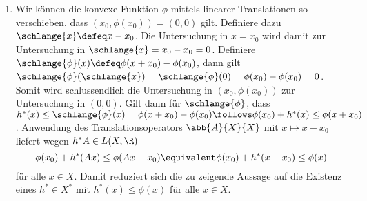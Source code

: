 \begin{exercisePage}
	\begin{enumerate}[label=(zu \alph*), leftmargin=*]
		\item Wir können die konvexe Funktion $\phi$ mittels linearer Translationen so verschieben, dass $(x_0, \phi(x_0))= (0,0)$ gilt.
		Definiere dazu $\schlange{x} \defeq x - x_0$. Die Untersuchung in $x = x_0$ wird damit zur Untersuchung in $\schlange{x} = x_0 - x_0 = 0$. Definiere $\schlange{\phi}(x) \defeq \phi(x+x_0) - \phi(x_0)$, dann gilt $\schlange{\phi}(\schlange{x}) = \schlange{\phi}(0) = \phi(x_0) - \phi(x_0) = 0$. Somit wird schlussendlich die Untersuchung in $(x_0, \phi(x_0))$ zur Untersuchung in $(0,0)$. Gilt dann für $\schlange{\phi}$, dass $h^\ast(x) \le \schlange{\phi}(x) = \phi(x+x_0) - \phi(x_0) \follows \phi(x_0) + h^\ast(x) \le \phi(x+x_0)$. Anwendung des Translationsoperators $\abb{A}{X}{X}$ mit $x \mapsto x - x_0$ liefert wegen $h^\ast A \in L(X,\R)$ 
		\begin{equation*}
			\phi(x_0) + h^\ast (Ax) \le \phi(Ax + x_0) \equivalent \phi(x_0) + h^\ast (x-x_0) \le \phi(x)
		\end{equation*}
		für alle $x \in X$. Damit reduziert sich die zu zeigende Aussage auf die Existenz eines $h^\ast \in X^\ast$ mit $h^\ast(x) \le \phi(x)$ für alle $x \in X$.
		

\end{enumerate}
\end{exercisePage}

